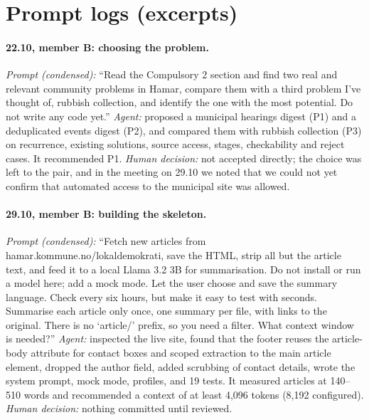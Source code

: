 \documentclass{article}
\begin{document}
\newpage
\appendix

\section{Prompt logs (excerpts)}

\paragraph{22.10, member B: choosing the problem.} \emph{Prompt (condensed):} ``Read the Compulsory 2
section and find two real and relevant community problems in Hamar, compare them with a third
problem I've thought of, rubbish collection, and identify the one with the most potential. Do not
write any code yet.'' \emph{Agent:} proposed a municipal hearings digest (P1) and a deduplicated
events digest (P2), and compared them with rubbish collection (P3) on recurrence, existing
solutions, source access, stages, checkability and reject cases. It recommended P1.
\emph{Human decision:} not accepted directly; the choice was left to the pair, and in the meeting
on 29.10 we noted that we could not yet confirm that automated access to the municipal site was
allowed.

\paragraph{29.10, member B: building the skeleton.} \emph{Prompt (condensed):} ``Fetch new articles from
hamar.kommune.no/lokaldemokrati, save the HTML, strip all but the article text, and feed it to a
local Llama 3.2 3B for summarisation. Do not install or run a model here; add a mock mode. Let
the user choose and save the summary language. Check every six hours, but make it easy to test
with seconds. Summarise each article only once, one summary per file, with links to the
original. There is no `article/' prefix, so you need a filter. What context window is needed?''
\emph{Agent:} inspected the live site, found that the footer reuses the article-body attribute for
contact boxes and scoped extraction to the main article element, dropped the author field, added
scrubbing of contact details, wrote the system prompt, mock mode, profiles, and 19 tests. It
measured articles at 140--510 words and recommended a context of at least 4,096 tokens (8,192
configured). \emph{Human decision:} nothing committed until reviewed.
\end{document}
